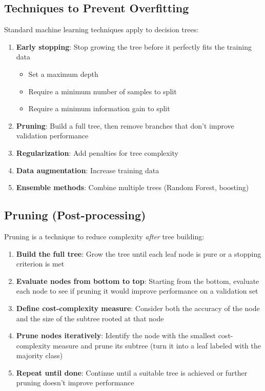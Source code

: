 \documentclass[11pt,a4paper]{article}
\theoremstyle{definition}
\theoremstyle{plain}
\theoremstyle{remark}
\begin{document}
\subsection{Techniques to Prevent Overfitting}

Standard machine learning techniques apply to decision trees:

\begin{enumerate}
    \item \textbf{Early stopping}: Stop growing the tree before it perfectly fits the training data
    \begin{itemize}
        \item Set a maximum depth
        \item Require a minimum number of samples to split
        \item Require a minimum information gain to split
    \end{itemize}
    
    \item \textbf{Pruning}: Build a full tree, then remove branches that don't improve validation performance
    
    \item \textbf{Regularization}: Add penalties for tree complexity
    
    \item \textbf{Data augmentation}: Increase training data
    
    \item \textbf{Ensemble methods}: Combine multiple trees (Random Forest, boosting)
\end{enumerate}

\subsection{Pruning (Post-processing)}

Pruning is a technique to reduce complexity \textit{after} tree building:

\begin{enumerate}
    \item \textbf{Build the full tree}: Grow the tree until each leaf node is pure or a stopping criterion is met
    
    \item \textbf{Evaluate nodes from bottom to top}: Starting from the bottom, evaluate each node to see if pruning it would improve performance on a validation set
    
    \item \textbf{Define cost-complexity measure}: Consider both the accuracy of the node and the size of the subtree rooted at that node
    
    \item \textbf{Prune nodes iteratively}: Identify the node with the smallest cost-complexity measure and prune its subtree (turn it into a leaf labeled with the majority class)
    
    \item \textbf{Repeat until done}: Continue until a suitable tree is achieved or further pruning doesn't improve performance
\end{enumerate}
\end{document}
